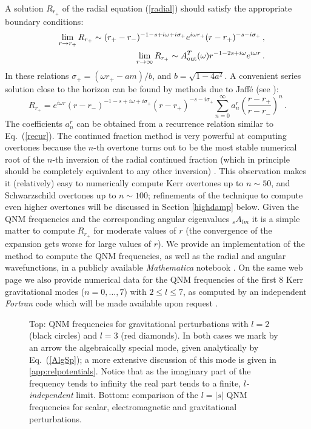 \documentclass[]{iopart}
\def\be{\begin{equation}}
\def\ee{\end{equation}}
\def\beq{\begin{eqnarray}}
\def\eeq{\end{eqnarray}}
\begin{document}
A solution $R_{r_+}$ of the radial equation (\ref{radial}) should satisfy the
appropriate boundary conditions:
%
\label{teuk-norm} \beq & & \lim_{r \to r_+}R_{r_+}\sim
(r_+-r_-)^{-1-s+i\omega+i\sigma_+} e^{i\omega
r_+}(r-r_+)^{-s-i\sigma_+}\,, \label{Rrp-norm}
\\
& & \lim_{r \to \infty }R_{r_+}\sim A_{\rm
out}^T(\omega)r^{-1-2s+i\omega}e^{i\omega r}\,. \label{psirmainf}
\eeq
%
In these relations $\sigma_+=\left(\omega r_+-am\right)/b$, and
$b=\sqrt{1-4a^2}$. A convenient series solution close to the horizon can be
found by methods due to Jaff\'e (see \cite{Leaver:1985ax}):
%
\be R_{r_+}=e^{i\omega r} (r-r_-)^{-1-s+i\omega+i\sigma_+}
(r-r_+)^{-s-i\sigma_+} \sum_{n=0}^{\infty} a^r_n\left
(\frac{r-r_+}{r-r_-} \right )^n\,.\label{Rrmaisdet} \ee
%
The coefficients $a_n^r$ can be obtained from a recurrence relation similar to
Eq.~(\ref{recur}). The continued fraction method is very powerful at computing
overtones because the $n$-th overtone turns out to be the most stable
numerical root of the $n$-th inversion of the radial continued fraction (which
in principle should be completely equivalent to any other inversion)
\cite{Leaver:1985ax}. This observation makes it (relatively) easy to
numerically compute Kerr overtones up to $n\sim 50$, and Schwarzschild
overtones up to $n\sim 100$; refinements of the technique to compute even
higher overtones will be discussed in Section \ref{highdamp} below.  Given the
QNM frequencies and the corresponding angular eigenvalues ${}_sA_{lm}$ it is a
simple matter to compute $R_{r_+}$ for moderate values of $r$ (the convergence
of the expansion gets worse for large values of $r$). We provide an
implementation of the method to compute the QNM frequencies, as well as the
radial and angular wavefunctions, in a publicly available {\it Mathematica}
notebook \cite{rdweb}.
On the same web page we also provide numerical data for the QNM frequencies of
the first 8 Kerr gravitational modes ($n=0,\dots,7$) with $2\leq l\leq 7$, as
computed by an independent {\it Fortran} code which will be made available
upon request \cite{Berti:2004md}.
%
\begin{figure}[h]
\begin{center}
\caption{Top: QNM frequencies for gravitational perturbations with $l=2$
  (black circles) and $l=3$ (red diamonds). In both cases we mark by an arrow
  the algebraically special mode, given analytically by Eq.~(\ref{AlgSp}); a
  more extensive discussion of this mode is given in
  \ref{app:relpotentials}. Notice that as the imaginary part of the frequency
  tends to infinity the real part tends to a finite, {\it $l$-independent}
  limit. Bottom: comparison of the $l=|s|$ QNM frequencies for scalar,
  electromagnetic and gravitational perturbations.}
\label{fig:schw}
\end{center}
\end{figure}
\end{document}
